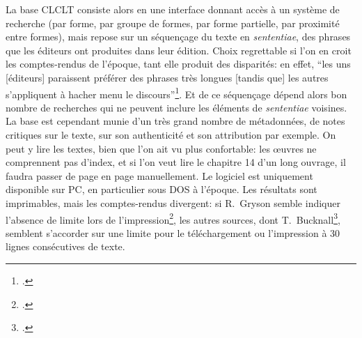 La base CLCLT consiste alors en une interface donnant accès à un système de recherche (par forme, par groupe de formes, par forme partielle, par proximité entre formes), mais repose sur un séquençage du texte en \textit{sententiae}, des phrases que les éditeurs ont produites dans leur édition. Choix regrettable si l'on en croit les comptes-rendus de l'époque, tant elle produit des disparités: en effet, \enquote{les uns {[éditeurs]} paraissent préférer des phrases très longues {[tandis que]} les autres s'appliquent à hacher menu le discours}\footcite{gryson_nouvelle_1992}. Et de ce séquençage dépend alors bon nombre de recherches qui ne peuvent inclure les éléments de \textit{sententiae} voisines. La base est cependant munie d'un très grand nombre de métadonnées, de notes critiques sur le texte, sur son authenticité et son attribution par exemple. On peut y lire les textes, bien que l'on ait vu plus confortable: les œuvres ne comprennent pas d'index, et si l'on veut lire le chapitre 14 d'un long ouvrage, il faudra passer de page en page manuellement. Le logiciel est uniquement disponible sur PC, en particulier sous DOS à l'époque. Les résultats sont imprimables, mais les comptes-rendus divergent: si R.~Gryson semble indiquer l'absence de limite lors de l'impression\footcite[p. 421]{gryson_nouvelle_1992}, les autres sources, dont T.~Bucknall\footcite[p. 94]{bucknall_review_1994}, semblent s'accorder sur une limite pour le téléchargement ou l'impression à 30 lignes consécutives de texte.


